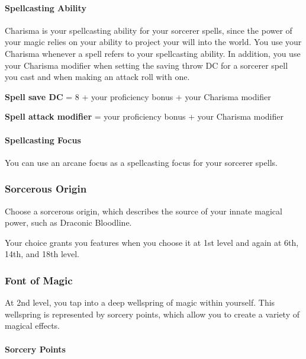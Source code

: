 \documentclass[
]{article}
\begin{document}
\hypertarget{spellcasting-ability}{%
\paragraph{Spellcasting Ability}\label{spellcasting-ability}}

Charisma is your spellcasting ability for your sorcerer spells, since
the power of your magic relies on your ability to project your will into
the world. You use your Charisma whenever a spell refers to your
spellcasting ability. In addition, you use your Charisma modifier when
setting the saving throw DC for a sorcerer spell you cast and when
making an attack roll with one.

\textbf{Spell save DC} = 8 + your proficiency bonus + your Charisma
modifier

\textbf{Spell attack modifier} = your proficiency bonus + your Charisma
modifier

\hypertarget{spellcasting-focus}{%
\paragraph{Spellcasting Focus}\label{spellcasting-focus}}

You can use an arcane focus as a spellcasting focus for your sorcerer
spells.

\hypertarget{sorcerous-origin}{%
\subsubsection{Sorcerous Origin}\label{sorcerous-origin}}

Choose a sorcerous origin, which describes the source of your innate
magical power, such as Draconic Bloodline.

Your choice grants you features when you choose it at 1st level and
again at 6th, 14th, and 18th level.

\hypertarget{font-of-magic}{%
\subsubsection{Font of Magic}\label{font-of-magic}}

At 2nd level, you tap into a deep wellspring of magic within yourself.
This wellspring is represented by sorcery points, which allow you to
create a variety of magical effects.

\hypertarget{sorcery-points}{%
\paragraph{Sorcery Points}\label{sorcery-points}}
\end{document}
